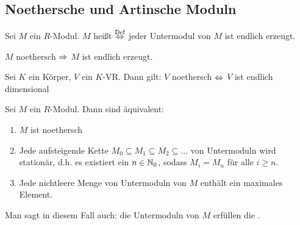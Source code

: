 \subsection{Noethersche und Artinsche Moduln}
\begin{df}\label{3.1}
	Sei $M$ ein $R$-Modul. $M$ heißt  $\overset{\text{Def}}{\Leftrightarrow}$ jeder Untermodul von $M$ ist endlich erzeugt.
\end{df}
\begin{anm}
	$M$ noethersch $\Rightarrow $ $M$ ist endlich erzeugt.
\end{anm}
\begin{bsp}
	Sei $K$ ein Körper, $V$ ein $K$-VR. Dann gilt: $V$ noethersch $\Leftrightarrow$ $V$ ist endlich dimensional
\end{bsp}
\begin{sa}\label{3.3}
	Sei $M$ ein $R$-Modul. Dann sind äquivalent:
	\begin{enumerate}[label= \roman*)]
		\item $M$ ist noethersch
		\item Jede aufsteigende Kette $M_0 \subseteq M_1 \subseteq M_2 \subseteq \dots $ von Untermoduln wird stationär, d.h. es existiert ein $ n \in \mathbb{N}_0$, sodass $M_i = M_n$ für alle $i \geq n $.
		\item Jede nichtleere Menge von Untermoduln von $M$ enthält ein maximales Element.
	\end{enumerate}
	Man sagt in diesem Fall auch: die Untermoduln von $M$ erfüllen die .
\end{sa}
